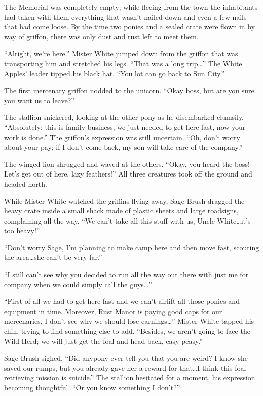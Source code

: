 \horizonline


The Memorial was completely empty; while fleeing from the town the inhabitants had taken with them everything that wasn't nailed down and even a few nails that had come loose. By the time two ponies and a sealed crate were flown in by way of griffon, there was only dust and rust left to meet them.

``Alright, we're here.'' Mister White jumped down from the griffon that was transporting him and stretched his legs. ``That was a long trip\dots'' The White Apples' leader tipped his black hat. ``You lot can go back to Sun City.''

The first mercenary griffon nodded to the unicorn. ``Okay boss, but are you sure you want us to leave?''

The stallion snickered, looking at the other pony as he disembarked clumsily. ``Absolutely; this is family business, we just needed to get here fast, now your work is done.'' The griffon's expression was still uncertain. ``Oh, don't worry about your pay; if I don't come back, my son will take care of the company.''

The winged lion shrugged and waved at the others. ``Okay, you heard the boss! Let's get out of here, lazy feathers!'' All three creatures took off the ground and headed north.

While Mister White watched the griffins flying away, Sage Brush dragged the heavy crate inside a small shack made of plastic sheets and large roadsigns, complaining all the way. ``We can't take all this stuff with us, Uncle White\dots it's too heavy!''

``Don't worry Sage, I'm planning to make camp here and then move fast, scouting the area\dots she can't be very far.''

``I still can't see why you decided to run all the way out there with just me for company when we could simply call the guys\dots''

``First of all we had to get here fast and we can't airlift all those ponies and equipment in time. Moreover, Rust Manor is paying good caps for our mercenaries, I don't see why we should lose earnings\dots'' Mister White tapped his chin, trying to find something else to add. ``Besides, we aren't going to face the Wild Herd; we will just get the foal and head back, easy peasy.''

Sage Brush sighed. ``Did anypony ever tell you that you are weird? I know she saved our rumps, but you already gave her a reward for that\dots I think this foal retrieving mission is suicide.'' The stallion hesitated for a moment, his expression becoming thoughtful. ``Or you know something I don't?''

